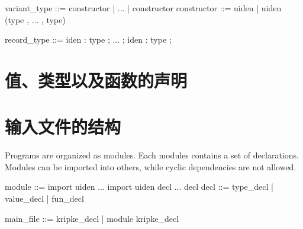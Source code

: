 variant_type ::= constructor | ... | constructor
constructor  ::= uiden | uiden (type , ... , type) 

record_type  ::= { iden : type ; ... ; iden : type ;}

\section{值、类型以及函数的声明}

\section{输入文件的结构}
Programs are organized as modules. Each modules contains a set of declarations. Modules can be imported into others, while cyclic dependencies are not allowed.

module ::= 
import uiden ... import uiden
decl ... decl
decl   ::= type_decl | value_decl | fun_decl

main_file ::= kripke_decl | module kripke_decl

\cleardoublepage
